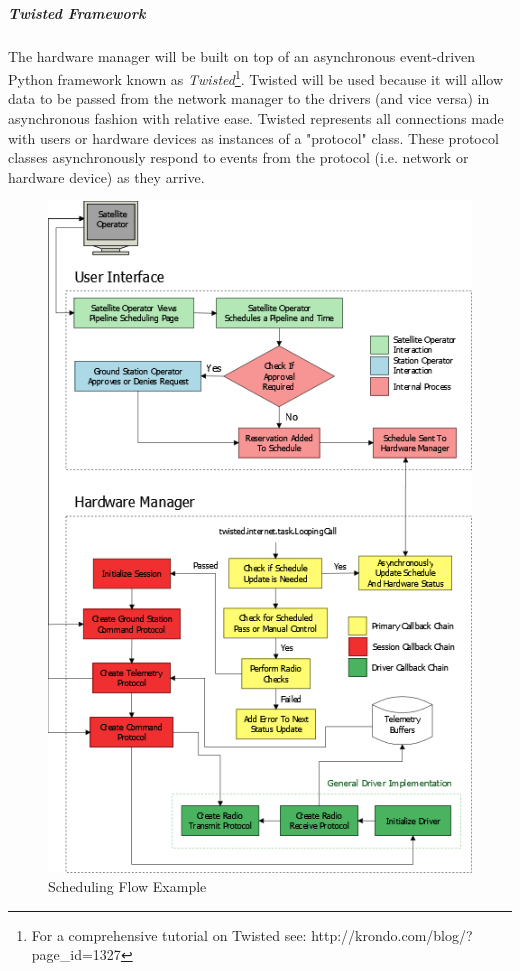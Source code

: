 \documentclass{mxl-design}
\begin{document}
\subparagraph{Twisted Framework}
The hardware manager will be built on top of an asynchronous event-driven Python framework known as \textit{Twisted}\footnote{For a comprehensive tutorial on Twisted see: http://krondo.com/blog/?page\_id=1327}. Twisted will be used because it will allow data to be passed from the network manager to the drivers (and vice versa) in asynchronous fashion with relative ease. Twisted represents all connections made with users or hardware devices as instances of a "protocol" class. These protocol classes asynchronously respond to events from the protocol (i.e. network or hardware device) as they arrive.

\begin{figure}[hbtp]
	\centering
	\includegraphics[scale=.55]{reservation_flow.png}
	\caption{Scheduling Flow Example}
	\label{schedule_flow}
\end{figure}
\end{document}
